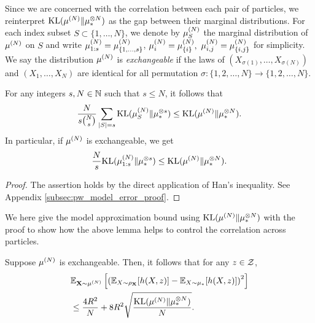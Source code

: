 Since we are concerned with the correlation between each pair of particles, we reinterpret $\KL(\pow[\mu,N] \| \tensor[\mu,N]_*)$ as the gap between their marginal distributions.
For each index subset $S \subset \{1,\ldots,N\}$, we denote by $\pow[\mu,N]_S$ the marginal distribution of $\pow[\mu,N]$ on $S$ and write $\pow[\mu,N]_{1:s} = \pow[\mu,N]_{\{1,\ldots,s\}}$,  $\pow[\mu,N]_{i} = \pow[\mu,N]_{\{i\}},~\pow[\mu,N]_{i,j} = \pow[\mu,N]_{\{i,j\}}$ for simplicity. We say the distribution $\pow[\mu,N]$ is {\it exchangeable} if the laws of $(X_{\sigma(1)},\ldots,X_{\sigma(N)})$ and $(X_1,\ldots,X_N)$ are identical for all permutation $\sigma: \{1,2,\ldots,N\} \rightarrow \{1,2,\ldots,N\}$.
\begin{lemma}\label{lemma:han_inequality}
For any integers $s, N \in \mathbb{N}$ such that $s\leq N$, it follows that
\begin{equation*}
    \frac{N}{s\binom{N}{s}} \sum_{|S| = s} \KL( \pow[\mu,N]_S \| \tensor[\mu_*,s]) 
    \leq \KL(\pow[\mu,N] \| \tensor[\mu_*,N]).
\end{equation*}
In particular, if $\pow[\mu,N]$ is exchangeable, we get
\begin{equation*}
    \frac{N}{s}  \KL( \pow[\mu,N]_{1:s} \| \tensor[\mu_*,s]) 
    \leq \KL(\pow[\mu,N] \| \tensor[\mu_*,N]).
\end{equation*}
\end{lemma}
\begin{proof}
    The assertion holds by the direct application of Han's inequality. See Appendix \ref{subsec:pw_model_error_proof}.
\end{proof}
We here give the model approximation bound using $\KL(\pow[\mu,N]\|\tensor[\mu_*,N])$ with the proof to show how the above lemma helps to control the correlation across particles.
\begin{proposition}\label{prop:pw_model_approximation}
    Suppose $\pow[\mu,N]$ is exchangeable. Then, it follows that for any $z \in \mathcal{Z}$,
    \begin{align*} 
        &\bE_{\vX \sim \pow[\mu,N]}\left[ \left( \bE_{X \sim \rho_\vX}[ h(X,z)] - \bE_{X\sim\mu_*}[h(X,z)]\right)^2 \right]  \\
        &\leq \frac{4R^2}{N} + 8R^2\sqrt{ \frac{\KL(\pow[\mu,N]\|\tensor[\mu_*,N])}{N}}.\
    \end{align*}
\end{proposition}
